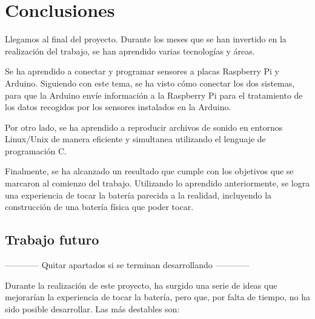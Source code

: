 
\chapter{Conclusiones}
\label{cha:Conclusiones}

    Llegamos al final del proyecto. Durante los meses que se han invertido en la realización del trabajo, se han
    aprendido varias tecnologías y áreas.

    Se ha aprendido a conectar y programar sensores a placas Raspberry Pi y Arduino. Siguiendo con este tema, se ha
    visto cómo conectar los dos sistemas, para que la Arduino envíe información a la Raspberry Pi para el tratamiento de
    los datos recogidos por los sensores instalados en la Arduino.

    Por otro lado, se ha aprendido a reproducir archivos de sonido en entornos Linux/Unix de manera eficiente y
    simultanea utilizando el lenguaje de programación C.

    Finalmente, se ha alcanzado un resultado que cumple con los objetivos que se marcaron al comienzo del trabajo.
    Utilizando lo aprendido anteriormente, se logra una experiencia de tocar la batería parecida a la realidad,
    incluyendo la construcción de una batería física que poder tocar.

    \section{Trabajo futuro} %
    \label{sec:TrabajoFuturo}

        ------------ Quitar apartados si se terminan desarrollando ------------

        Durante la realización de este proyecto, ha surgido una serie de ideas que mejorarían la experiencia de tocar la
        batería, pero que, por falta de tiempo, no ha sido posible desarrollar. Las más destables son:

